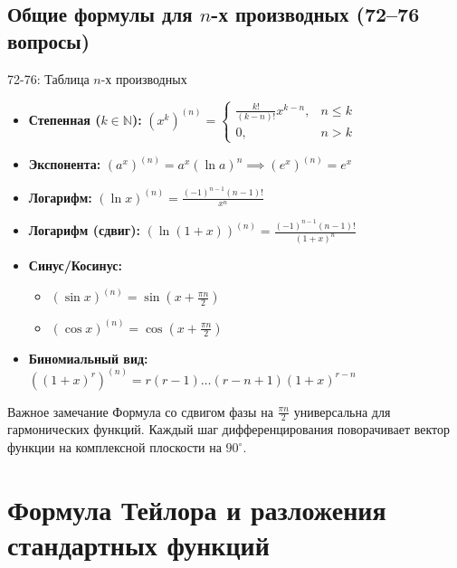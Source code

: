 \documentclass[a4paper,12pt]{article}
\begin{document}
	
	
	
	
	
	
	
	\subsection{Общие формулы для $n$-х производных (72--76 вопросы)}
	
	\begin{theorembox}{{72-76: Таблица $n$-х производных}}
		\begin{itemize}
			\item \textbf{Степенная ($k \in \mathbb{N}$):} $(x^k)^{(n)} = \begin{cases} \frac{k!}{(k-n)!}x^{k-n}, & n \le k \\ 0, & n > k \end{cases}$
			\item \textbf{Экспонента:} $(a^x)^{(n)} = a^x (\ln a)^n \implies (e^x)^{(n)} = e^x$
			\item \textbf{Логарифм:} $(\ln x)^{(n)} = \frac{(-1)^{n-1}(n-1)!}{x^n}$
			\item \textbf{Логарифм (сдвиг):} $(\ln(1+x))^{(n)} = \frac{(-1)^{n-1}(n-1)!}{(1+x)^n}$
			\item \textbf{Синус/Косинус:} 
			\begin{itemize}
				\item $(\sin x)^{(n)} = \sin(x + \frac{\pi n}{2})$
				\item $(\cos x)^{(n)} = \cos(x + \frac{\pi n}{2})$
			\end{itemize}
			\item \textbf{Биномиальный вид:} $((1+x)^r)^{(n)} = r(r-1)\dots(r-n+1)(1+x)^{r-n}$
		\end{itemize}
	\end{theorembox}
	
	\begin{notebook}{Важное замечание}
		Формула со сдвигом фазы на $\frac{\pi n}{2}$ универсальна для гармонических функций. Каждый шаг дифференцирования поворачивает вектор функции на комплексной плоскости на $90^\circ$.
	\end{notebook}
	
	
	
	
	
	
	
	
	\newpage
	\section{Формула Тейлора и разложения стандартных функций}
	
\end{document}
